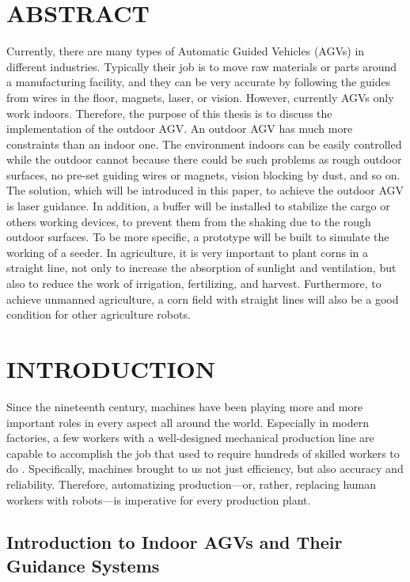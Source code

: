 \documentclass[letterpaper,12pt,oneside]{book}
\begin{document}
	\chapter*{ABSTRACT}
		Currently, there are many types of Automatic Guided Vehicles (AGVs) in different industries. Typically their job is to move raw materials or parts around a manufacturing facility, and they can be very accurate by following the guides from wires in the floor, magnets, laser, or vision. However, currently AGVs only work indoors. Therefore, the purpose of this thesis is to discuss the implementation of the outdoor AGV. An outdoor AGV has much more constraints than an indoor one. The environment indoors can be easily controlled while the outdoor cannot because there could be such problems as rough outdoor surfaces, no pre-set guiding wires or magnets, vision blocking by dust, and so on. The solution, which will be introduced in this paper, to achieve the outdoor AGV is laser guidance. In addition, a buffer will be installed to stabilize the cargo or others working devices, to prevent them from the shaking due to the rough outdoor surfaces. To be more specific, a prototype will be built to simulate the working of a seeder. In agriculture, it is very important to plant corns in a straight line, not only to increase the absorption of sunlight and ventilation, but also to reduce the work of irrigation, fertilizing, and harvest. Furthermore, to achieve unmanned agriculture, a corn field with straight lines will also be a good condition for other agriculture robots. 
	 
	\mainmatter
	\setcounter{secnumdepth}{3}
	\chapter{INTRODUCTION}
	Since the nineteenth century, machines have been playing more and more important roles in every aspect all around the world. Especially in modern factories, a few workers with a well-designed mechanical production line are capable to accomplish the job that used to require hundreds of skilled workers to do . Specifically, machines brought to us not just efficiency, but also accuracy and reliability. Therefore, automatizing production—or, rather, replacing human workers with robots—is imperative for every production plant.
		\section{Introduction to Indoor AGVs and Their Guidance Systems}
		
\end{document}
